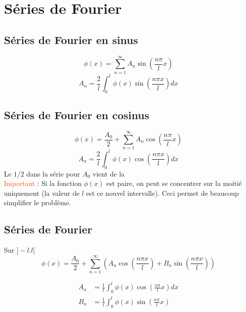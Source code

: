 \documentclass[resume]{subfiles}
\begin{document}
\section{Séries de Fourier}
\subsection{Séries de Fourier en sinus}
$$\boxed{\phi(x)=\sum_{n=1}^{\infty}A_n\sin\left(\frac{n\pi}{l}x\right)}$$
$$\boxed{A_n=\frac{2}{l}\int_{0}^{l}\phi(x)\sin\left(\frac{n\pi x}{l}\right)dx}$$
\subsection{Séries de Fourier en cosinus}
$$\boxed{\phi(x)=\frac{A_0}{2}+\sum_{n=1}^{\infty}A_n\cos\left(\frac{n\pi}{l}x\right)}$$
$$\boxed{A_n=\frac{2}{l}\int_{0}^{l}\phi(x)\cos\left(\frac{n\pi x}{l}\right)dx}$$
Le $1/2$ dans la série pour $A_0$ vient de la\\
\textcolor{OrangeRed}{Important} : Si la fonction $\phi(x)$ est paire, on peut se concentrer sur la moitié uniquement (la valeur de $l$ est ce nouvel intervalle). Ceci permet de beaucoup simplifier le problème.
\subsection{Séries de Fourier}
Sur $]-l.l[$
$$\boxed{\phi(x)=\frac{A_0}{2}+\sum_{n=1}^{\infty}\left(A_n\cos\left(\frac{n\pi x}{l}\right)+B_n\sin\left(\frac{n\pi x}{l}\right)\right)}$$

\begin{align*}
A_n &= \frac{1}{l}\int_{0}^{l}\phi(x)\cos\left(\frac{n\pi}{l}x\right)dx\\
B_n &=\frac{1}{l}\int_{0}^{l}\phi(x)\sin\left(\frac{n\pi}{l}x\right)
\end{align*}
\end{document}
